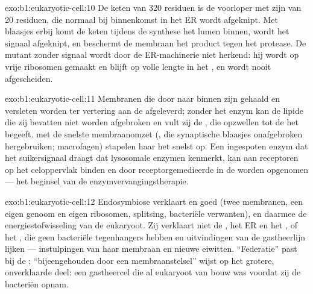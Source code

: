 \begin{solution}{exo:b1:eukaryotic-cell:10}
De keten van \qty{320}{} residuen is de voorloper met zijn  van
\qty{20}{} residuen, die normaal bij binnenkomst in het ER wordt afgeknipt. Met
blaasjes erbij komt de keten tijdens de synthese het lumen binnen, wordt het
signaal afgeknipt, en beschermt de membraan het product tegen het protease. De
mutant zonder signaal wordt door de ER-machinerie niet herkend: hij wordt op
vrije ribosomen gemaakt en blijft op volle lengte in het , en wordt nooit
afgescheiden.
\end{solution}

\begin{solution}{exo:b1:eukaryotic-cell:11}
Membranen die door  naar binnen zijn gehaald en versleten 
worden ter vertering aan de  afgeleverd; zonder het enzym kan de lipide
die zij bevatten niet worden afgebroken en vult zij de , die opzwellen
tot de  het begeeft.  met de snelste membraanomzet (, die
synaptische blaasjes onafgebroken hergebruiken; macrofagen) stapelen haar het
snelst op. Een ingespoten enzym dat het suikersignaal draagt dat lysosomale
enzymen kenmerkt, kan aan receptoren op het celoppervlak binden en door
receptorgemedieerde  in de  worden opgenomen --- het beginsel
van de enzymvervangingstherapie.
\end{solution}

\begin{solution}{exo:b1:eukaryotic-cell:12}
Endosymbiose verklaart  en  goed (twee membranen, een eigen
genoom en eigen ribosomen, splitsing, bacteriële verwanten), en daarmee de
energiestofwisseling van de eukaryoot. Zij verklaart niet de , het ER en
het , of het , die geen bacteriële tegenhangers hebben en
uitvindingen van de gastheerlijn lijken --- instulpingen van haar membraan en
nieuwe eiwitten. ``Federatie'' past bij de ; ``bijeengehouden door een
membraanstelsel'' wijst op het grotere, onverklaarde deel: een gastheercel die al
eukaryoot van bouw was voordat zij de bacteriën opnam.
\end{solution}

